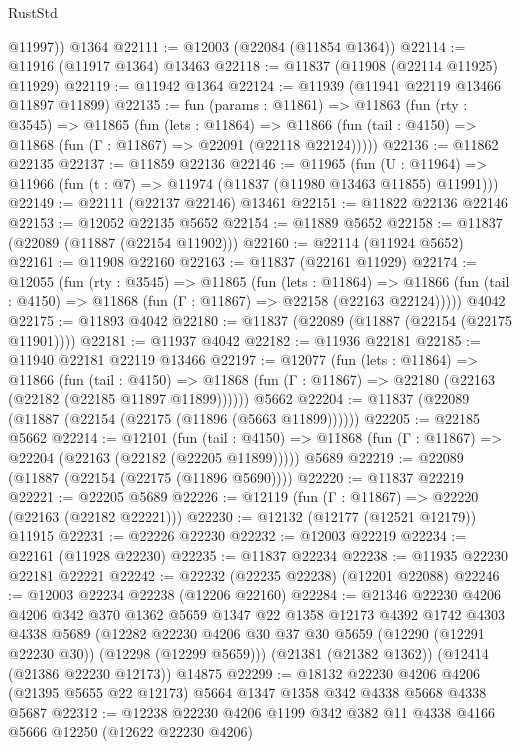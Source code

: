 \begin{lexlean}{RustStd}
\begin{coremodule}
{\begin{coremodule}
{{{{{{{{{{{{{{{{{{{{{{{{{{{{{{{{{{{{{{{{{{{{{{{{{{        @11997))
    @1364
@22111 := @12003 (@22084 (@11854 @1364))
@22114 := @11916 (@11917 @1364) @13463
@22118 := @11837 (@11908 (@22114 @11925) @11929)
@22119 := @11942 @1364
@22124 := @11939 (@11941 @22119 @13466 @11897 @11899)
@22135 := fun (params : @11861) =>
  @11863
    (fun (rty : @3545) =>
    @11865
      (fun (lets : @11864) =>
      @11866 (fun (tail : @4150) => @11868 (fun (Γ : @11867) => @22091 (@22118 @22124)))))
@22136 := @11862 @22135
@22137 := @11859 @22136
@22146 := @11965
    (fun (U : @11964) => @11966 (fun (t : @7) => @11974 (@11837 (@11980 @13463 @11855) @11991)))
@22149 := @22111 (@22137 @22146) @13461
@22151 := @11822 @22136 @22146
@22153 := @12052 @22135 @5652
@22154 := @11889 @5652
@22158 := @11837 (@22089 (@11887 (@22154 @11902)))
@22160 := @22114 (@11924 @5652)
@22161 := @11908 @22160
@22163 := @11837 (@22161 @11929)
@22174 := @12055
    (fun (rty : @3545) =>
    @11865
      (fun (lets : @11864) =>
      @11866 (fun (tail : @4150) => @11868 (fun (Γ : @11867) => @22158 (@22163 @22124)))))
    @4042
@22175 := @11893 @4042
@22180 := @11837 (@22089 (@11887 (@22154 (@22175 @11901))))
@22181 := @11937 @4042
@22182 := @11936 @22181
@22185 := @11940 @22181 @22119 @13466
@22197 := @12077
    (fun (lets : @11864) =>
    @11866
      (fun (tail : @4150) =>
      @11868 (fun (Γ : @11867) => @22180 (@22163 (@22182 (@22185 @11897 @11899))))))
    @5662
@22204 := @11837 (@22089 (@11887 (@22154 (@22175 (@11896 (@5663 @11899))))))
@22205 := @22185 @5662
@22214 := @12101
    (fun (tail : @4150) => @11868 (fun (Γ : @11867) => @22204 (@22163 (@22182 (@22205 @11899)))))
    @5689
@22219 := @22089 (@11887 (@22154 (@22175 (@11896 @5690))))
@22220 := @11837 @22219
@22221 := @22205 @5689
@22226 := @12119 (fun (Γ : @11867) => @22220 (@22163 (@22182 @22221)))
@22230 := @12132 (@12177 (@12521 @12179)) @11915
@22231 := @22226 @22230
@22232 := @12003 @22219
@22234 := @22161 (@11928 @22230)
@22235 := @11837 @22234
@22238 := @11935 @22230 @22181 @22221
@22242 := @22232 (@22235 @22238) (@12201 @22088)
@22246 := @12003 @22234 @22238 (@12206 @22160)
@22284 := @21346
    @22230
    @4206
    @4206
    @342
    @370
    @1362
    @5659
    @1347
    @22
    @1358
    @12173
    @4392
    @1742
    @4303
    @4338
    @5689
    (@12282 @22230 @4206 @30 @37 @30 @5659 (@12290 (@12291 @22230 @30)) (@12298 (@12299 @5659)))
    (@21381 (@21382 @1362))
    (@12414 (@21386 @22230 @12173))
    @14875
@22299 := @18132
    @22230
    @4206
    @4206
    (@21395 @5655 @22 @12173)
    @5664
    @1347
    @1358
    @342
    @4338
    @5668
    @4338
    @5687
@22312 := @12238 @22230 @4206 @1199 @342 @382 @11 @4338 @4166 @5666 @12250 (@12622 @22230 @4206)
}}}}}}}}}}}}}}}}}}}}}}}}}}}}}}}}}}}}}}}}}}}}}}}}}}
\end{coremodule}}
\end{coremodule}
\end{lexlean}
